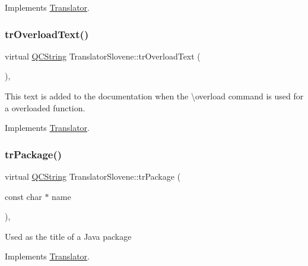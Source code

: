 Implements \mbox{\hyperlink{class_translator}{Translator}}.

\mbox{\label{class_translator_slovene_ad89cf9e19c328cff11a3b253adf6e751}} 
\subsubsection{\texorpdfstring{trOverloadText()}{trOverloadText()}}
{\footnotesize\ttfamily virtual \mbox{\hyperlink{class_q_c_string}{Q\+C\+String}} Translator\+Slovene\+::tr\+Overload\+Text (\begin{DoxyParamCaption}{ }\end{DoxyParamCaption})\hspace{0.3cm}{\ttfamily [inline]}, {\ttfamily [virtual]}}

This text is added to the documentation when the \textbackslash{}overload command is used for a overloaded function. 

Implements \mbox{\hyperlink{class_translator}{Translator}}.

\mbox{\label{class_translator_slovene_a84d64ca0fa36953ef758ee8a29a19943}} 
\subsubsection{\texorpdfstring{trPackage()}{trPackage()}}
{\footnotesize\ttfamily virtual \mbox{\hyperlink{class_q_c_string}{Q\+C\+String}} Translator\+Slovene\+::tr\+Package (\begin{DoxyParamCaption}\item[{const char $\ast$}]{name }\end{DoxyParamCaption})\hspace{0.3cm}{\ttfamily [inline]}, {\ttfamily [virtual]}}

Used as the title of a Java package 

Implements \mbox{\hyperlink{class_translator}{Translator}}.

\mbox{\label{class_translator_slovene_a3243803d2a38ff05f0b82af0a7e734c7}} 
